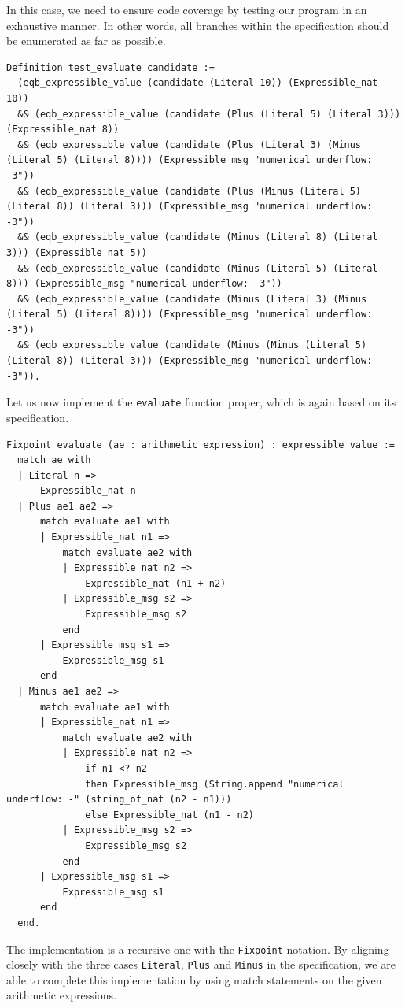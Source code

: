 \documentclass{article}
\begin{document}
In this case, we need to ensure code coverage by testing our program in an exhaustive manner. In other words, all branches within the specification should be enumerated as far as possible.

\begin{lstlisting}
Definition test_evaluate candidate :=
  (eqb_expressible_value (candidate (Literal 10)) (Expressible_nat 10))
  && (eqb_expressible_value (candidate (Plus (Literal 5) (Literal 3))) (Expressible_nat 8))
  && (eqb_expressible_value (candidate (Plus (Literal 3) (Minus (Literal 5) (Literal 8)))) (Expressible_msg "numerical underflow: -3"))
  && (eqb_expressible_value (candidate (Plus (Minus (Literal 5) (Literal 8)) (Literal 3))) (Expressible_msg "numerical underflow: -3"))
  && (eqb_expressible_value (candidate (Minus (Literal 8) (Literal 3))) (Expressible_nat 5))
  && (eqb_expressible_value (candidate (Minus (Literal 5) (Literal 8))) (Expressible_msg "numerical underflow: -3"))
  && (eqb_expressible_value (candidate (Minus (Literal 3) (Minus (Literal 5) (Literal 8)))) (Expressible_msg "numerical underflow: -3"))
  && (eqb_expressible_value (candidate (Minus (Minus (Literal 5) (Literal 8)) (Literal 3))) (Expressible_msg "numerical underflow: -3")).
\end{lstlisting}

Let us now implement the \texttt{evaluate} function proper, which is again based on its specification.

\begin{lstlisting}
Fixpoint evaluate (ae : arithmetic_expression) : expressible_value :=
  match ae with
  | Literal n =>
      Expressible_nat n
  | Plus ae1 ae2 =>
      match evaluate ae1 with
      | Expressible_nat n1 =>
          match evaluate ae2 with
          | Expressible_nat n2 =>
              Expressible_nat (n1 + n2)
          | Expressible_msg s2 =>
              Expressible_msg s2
          end
      | Expressible_msg s1 =>
          Expressible_msg s1
      end
  | Minus ae1 ae2 =>
      match evaluate ae1 with
      | Expressible_nat n1 =>
          match evaluate ae2 with
          | Expressible_nat n2 =>
              if n1 <? n2
              then Expressible_msg (String.append "numerical underflow: -" (string_of_nat (n2 - n1)))
              else Expressible_nat (n1 - n2)
          | Expressible_msg s2 =>
              Expressible_msg s2
          end
      | Expressible_msg s1 =>
          Expressible_msg s1
      end
  end.
\end{lstlisting}

The implementation is a recursive one with the \texttt{Fixpoint} notation. By aligning closely with the three cases \texttt{Literal}, \texttt{Plus} and \texttt{Minus} in the specification, we are able to complete this implementation by using match statements on the given arithmetic expressions. 
\end{document}
